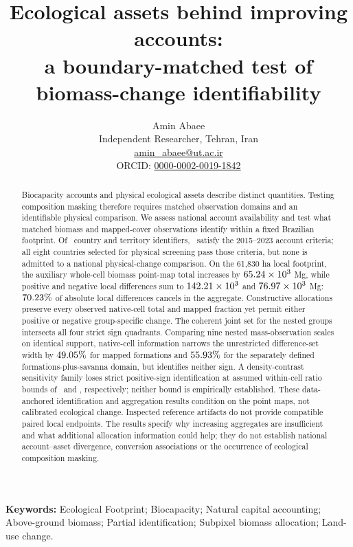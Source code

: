 \documentclass[11pt,a4paper]{article}
\title{Ecological assets behind improving accounts:\\a boundary-matched test of biomass-change identifiability}
\author{Amin Abaee\\\small Independent Researcher, Tehran, Iran\\\small\href{mailto:amin_abaee@ut.ac.ir}{amin\_abaee@ut.ac.ir}\\\small ORCID: \href{https://orcid.org/0000-0002-0019-1842}{0000-0002-0019-1842}}
\date{}
\begin{document}
\maketitle
\begin{abstract}
Biocapacity accounts and physical ecological assets describe distinct quantities. Testing composition masking therefore requires matched observation domains and an identifiable physical comparison. We assess national account availability and test what matched biomass and mapped-cover observations identify within a fixed Brazilian footprint. Of \CountryIDs\ country and territory identifiers, \AccountPass\ satisfy the 2015--2023 account criteria; all eight countries selected for physical screening pass those criteria, but none is admitted to a national physical-change comparison. On the 61,830 ha local footprint, the auxiliary whole-cell biomass point-map total increases by $65.24\times10^3$ Mg, while positive and negative local differences sum to $142.21\times10^3$ and $76.97\times10^3$ Mg: $70.23\%$ of absolute local differences cancels in the aggregate. Constructive allocations preserve every observed native-cell total and mapped fraction yet permit either positive or negative group-specific change. The coherent joint set for the nested groups intersects all four strict sign quadrants. Comparing nine nested mass-observation scales on identical support, native-cell information narrows the unrestricted difference-set width by $49.05\%$ for mapped formations and $55.93\%$ for the separately defined formations-plus-savanna domain, but identifies neither sign. A density-contrast sensitivity family loses strict positive-sign identification at assumed within-cell ratio bounds of \RatioForm\ and \RatioSav, respectively; neither bound is empirically established. These data-anchored identification and aggregation results condition on the point maps, not calibrated ecological change. Inspected reference artifacts do not provide compatible paired local endpoints. The results specify why increasing aggregates are insufficient and what additional allocation information could help; they do not establish national account--asset divergence, conversion associations or the occurrence of ecological composition masking.
\end{abstract}

\noindent\textbf{Keywords:} Ecological Footprint; Biocapacity; Natural capital accounting; Above-ground biomass; Partial identification; Subpixel biomass allocation; Land-use change.
\end{document}
